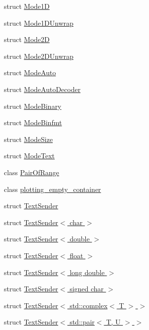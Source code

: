 \begin{DoxyCompactItemize}
\item 
struct \hyperlink{structgnuplotio_1_1_mode1_d}{Mode1D}
\item 
struct \hyperlink{structgnuplotio_1_1_mode1_d_unwrap}{Mode1\+D\+Unwrap}
\item 
struct \hyperlink{structgnuplotio_1_1_mode2_d}{Mode2D}
\item 
struct \hyperlink{structgnuplotio_1_1_mode2_d_unwrap}{Mode2\+D\+Unwrap}
\item 
struct \hyperlink{structgnuplotio_1_1_mode_auto}{Mode\+Auto}
\item 
struct \hyperlink{structgnuplotio_1_1_mode_auto_decoder}{Mode\+Auto\+Decoder}
\item 
struct \hyperlink{structgnuplotio_1_1_mode_binary}{Mode\+Binary}
\item 
struct \hyperlink{structgnuplotio_1_1_mode_binfmt}{Mode\+Binfmt}
\item 
struct \hyperlink{structgnuplotio_1_1_mode_size}{Mode\+Size}
\item 
struct \hyperlink{structgnuplotio_1_1_mode_text}{Mode\+Text}
\item 
class \hyperlink{classgnuplotio_1_1_pair_of_range}{Pair\+Of\+Range}
\item 
class \hyperlink{classgnuplotio_1_1plotting__empty__container}{plotting\+\_\+empty\+\_\+container}
\item 
struct \hyperlink{structgnuplotio_1_1_text_sender}{Text\+Sender}
\item 
struct \hyperlink{structgnuplotio_1_1_text_sender_3_01char_01_4}{Text\+Sender$<$ char $>$}
\item 
struct \hyperlink{structgnuplotio_1_1_text_sender_3_01double_01_4}{Text\+Sender$<$ double $>$}
\item 
struct \hyperlink{structgnuplotio_1_1_text_sender_3_01float_01_4}{Text\+Sender$<$ float $>$}
\item 
struct \hyperlink{structgnuplotio_1_1_text_sender_3_01long_01double_01_4}{Text\+Sender$<$ long double $>$}
\item 
struct \hyperlink{structgnuplotio_1_1_text_sender_3_01signed_01char_01_4}{Text\+Sender$<$ signed char $>$}
\item 
struct \hyperlink{structgnuplotio_1_1_text_sender_3_01std_1_1complex_3_01_t_01_4_01_4}{Text\+Sender$<$ std\+::complex$<$ T $>$ $>$}
\item 
struct \hyperlink{structgnuplotio_1_1_text_sender_3_01std_1_1pair_3_01_t_00_01_u_01_4_01_4}{Text\+Sender$<$ std\+::pair$<$ T, U $>$ $>$}
\item 

\end{DoxyCompactItemize}
